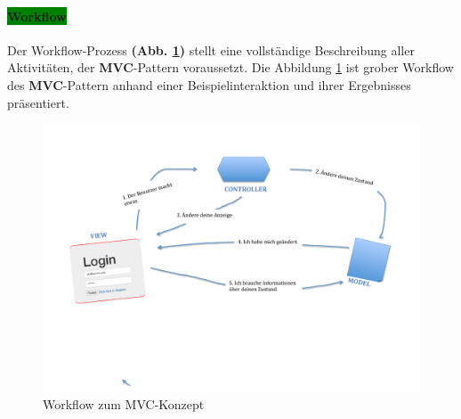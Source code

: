 \paragraph{\colorbox{green}{Workflow}}

Der Workflow-Prozess \textbf{(Abb. \ref{img:mvc})} stellt eine vollständige Beschreibung aller Aktivitäten, der \textbf{MVC}-Pattern voraussetzt. Die Abbildung \ref{img:mvc} ist grober Workflow des \textbf{MVC}-Pattern anhand einer Beispielinteraktion und ihrer Ergebnisses präsentiert.
\begin{figure}[H]
\centering
\includegraphics[trim = 0mm 60mm 0mm 20mm, clip, width=1.0\textwidth]{resources/mvc}
\caption[Workflow zum MVC-Konzept]{Workflow zum MVC-Konzept}
\label{img:mvc}
\end{figure}

